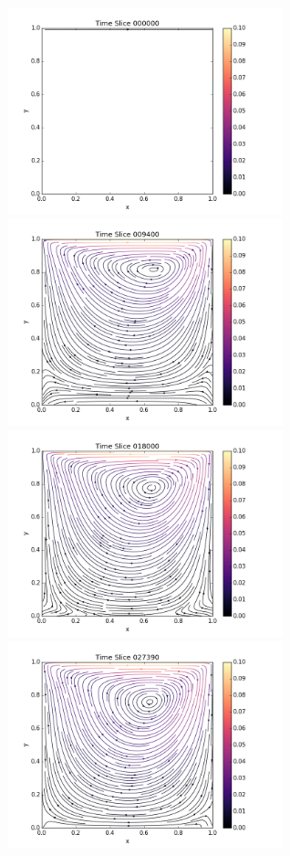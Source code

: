 \documentclass[11pt]{article}
\begin{document}
\begin{center}
\begin{figure}[ht!]
\begin{minipage}{16cm}\label{streamlines}
\includegraphics[width=8cm]{seq01}\includegraphics[width=8cm]{seq02}
\includegraphics[width=8cm]{seq03}\includegraphics[width=8cm]{seq04}

\end{minipage}
\end{figure}
\end{center}
\end{document}
